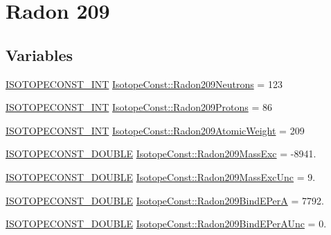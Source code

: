 \hypertarget{group___isotope_const-_radon-_rn209}{}\section{Radon 209}
\label{group___isotope_const-_radon-_rn209}
\subsection*{Variables}
\begin{DoxyCompactItemize}
\item 
\mbox{\hyperlink{group___isotope_const-_macros_ga5f18360b3e99483a35c32d789e62621c}{I\+S\+O\+T\+O\+P\+E\+C\+O\+N\+S\+T\+\_\+\+I\+NT}} \mbox{\hyperlink{group___isotope_const-_radon-_rn209_ga4969a89f7d9c38d97700f22520dc519c}{Isotope\+Const\+::\+Radon209\+Neutrons}} = 123
\item 
\mbox{\hyperlink{group___isotope_const-_macros_ga5f18360b3e99483a35c32d789e62621c}{I\+S\+O\+T\+O\+P\+E\+C\+O\+N\+S\+T\+\_\+\+I\+NT}} \mbox{\hyperlink{group___isotope_const-_radon-_rn209_gad0029049e578170ee7f7fd952f1dbdeb}{Isotope\+Const\+::\+Radon209\+Protons}} = 86
\item 
\mbox{\hyperlink{group___isotope_const-_macros_ga5f18360b3e99483a35c32d789e62621c}{I\+S\+O\+T\+O\+P\+E\+C\+O\+N\+S\+T\+\_\+\+I\+NT}} \mbox{\hyperlink{group___isotope_const-_radon-_rn209_ga4e85490782e032f678703f59d1fb11f9}{Isotope\+Const\+::\+Radon209\+Atomic\+Weight}} = 209
\item 
\mbox{\hyperlink{group___isotope_const-_macros_ga8f45a7272ce02c0b4c65c44636ed719a}{I\+S\+O\+T\+O\+P\+E\+C\+O\+N\+S\+T\+\_\+\+D\+O\+U\+B\+LE}} \mbox{\hyperlink{group___isotope_const-_radon-_rn209_gae37d654b033f9d49cc41d805e1132656}{Isotope\+Const\+::\+Radon209\+Mass\+Exc}} = -\/8941.
\item 
\mbox{\hyperlink{group___isotope_const-_macros_ga8f45a7272ce02c0b4c65c44636ed719a}{I\+S\+O\+T\+O\+P\+E\+C\+O\+N\+S\+T\+\_\+\+D\+O\+U\+B\+LE}} \mbox{\hyperlink{group___isotope_const-_radon-_rn209_ga1b9d492e71d398d96885985f23e4760c}{Isotope\+Const\+::\+Radon209\+Mass\+Exc\+Unc}} = 9.
\item 
\mbox{\hyperlink{group___isotope_const-_macros_ga8f45a7272ce02c0b4c65c44636ed719a}{I\+S\+O\+T\+O\+P\+E\+C\+O\+N\+S\+T\+\_\+\+D\+O\+U\+B\+LE}} \mbox{\hyperlink{group___isotope_const-_radon-_rn209_gab93af3ad08dbbad5a510621d68131ae2}{Isotope\+Const\+::\+Radon209\+Bind\+E\+PerA}} = 7792.
\item 
\mbox{\hyperlink{group___isotope_const-_macros_ga8f45a7272ce02c0b4c65c44636ed719a}{I\+S\+O\+T\+O\+P\+E\+C\+O\+N\+S\+T\+\_\+\+D\+O\+U\+B\+LE}} \mbox{\hyperlink{group___isotope_const-_radon-_rn209_ga690e739b47eca20a10fb41c60c5db056}{Isotope\+Const\+::\+Radon209\+Bind\+E\+Per\+A\+Unc}} = 0.

\end{DoxyCompactItemize}
